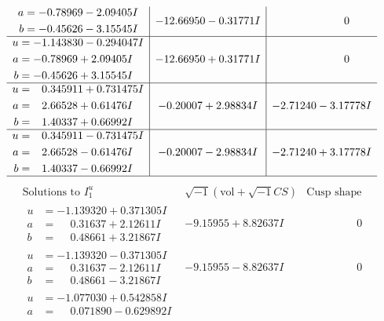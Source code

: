 \documentclass[1p]{elsarticle_modified}
\theoremstyle{definition}
\newcommand{\I}{\sqrt{-1}}
\begin{document}
$$\begin{array}{c|c|c}
\begin{aligned}
a &= -0.78969 - 2.09405 I \\
b &= -0.45626 - 3.15545 I\end{aligned}
 & -12.66950 - 0.31771 I & \phantom{-0.000000 } 0 \\ \hline\begin{aligned}
u &= -1.143830 - 0.294047 I \\
a &= -0.78969 + 2.09405 I \\
b &= -0.45626 + 3.15545 I\end{aligned}
 & -12.66950 + 0.31771 I & \phantom{-0.000000 } 0 \\ \hline\begin{aligned}
u &= \phantom{-}0.345911 + 0.731475 I \\
a &= \phantom{-}2.66528 + 0.61476 I \\
b &= \phantom{-}1.40337 + 0.66992 I\end{aligned}
 & -0.20007 + 2.98834 I & -2.71240 - 3.17778 I \\ \hline\begin{aligned}
u &= \phantom{-}0.345911 - 0.731475 I \\
a &= \phantom{-}2.66528 - 0.61476 I \\
b &= \phantom{-}1.40337 - 0.66992 I\end{aligned}
 & -0.20007 - 2.98834 I & -2.71240 + 3.17778 I\\
 \hline 
 \end{array}$$\newpage$$\begin{array}{c|c|c}  
\text{Solutions to }I^u_{1}& \I (\text{vol} + \sqrt{-1}CS) & \text{Cusp shape}\\
 \hline 
\begin{aligned}
u &= -1.139320 + 0.371305 I \\
a &= \phantom{-}0.31637 + 2.12611 I \\
b &= \phantom{-}0.48661 + 3.21867 I\end{aligned}
 & -9.15955 + 8.82637 I & \phantom{-0.000000 } 0 \\ \hline\begin{aligned}
u &= -1.139320 - 0.371305 I \\
a &= \phantom{-}0.31637 - 2.12611 I \\
b &= \phantom{-}0.48661 - 3.21867 I\end{aligned}
 & -9.15955 - 8.82637 I & \phantom{-0.000000 } 0 \\ \hline\begin{aligned}
u &= -1.077030 + 0.542858 I \\
a &= \phantom{-}0.071890 - 0.629892 I \\

\end{aligned}
\end{array}$$
\end{document}
